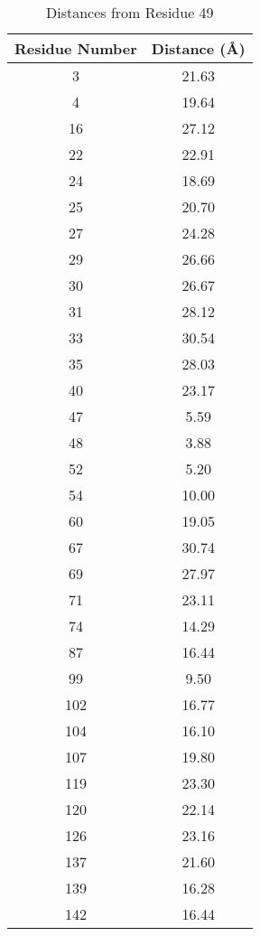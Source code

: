 \documentclass{article}
\begin{document}
\begin{table}[h]
    \centering
    \caption{Distances from Residue 49}
    \begin{tabular}{@{}cc@{}}
        \toprule
        \textbf{Residue Number} & \textbf{Distance (Å)} \\ \midrule
        3   & 21.63 \\ \hline
        4   & 19.64 \\ \hline
        16  & 27.12 \\ \hline
        22  & 22.91 \\ \hline
        24  & 18.69 \\ \hline
        25  & 20.70 \\ \hline
        27  & 24.28 \\ \hline
        29  & 26.66 \\ \hline
        30  & 26.67 \\ \hline
        31  & 28.12 \\ \hline
        33  & 30.54 \\ \hline
        35  & 28.03 \\ \hline
        40  & 23.17 \\ \hline
        47  & 5.59  \\ \hline
        48  & 3.88  \\ \hline
        52  & 5.20  \\ \hline
        54  & 10.00 \\ \hline
        60  & 19.05 \\ \hline
        67  & 30.74 \\ \hline
        69  & 27.97 \\ \hline
        71  & 23.11 \\ \hline
        74  & 14.29 \\ \hline
        87  & 16.44 \\ \hline
        99  & 9.50  \\ \hline
        102 & 16.77 \\ \hline
        104 & 16.10 \\ \hline
        107 & 19.80 \\ \hline
        119 & 23.30 \\ \hline
        120 & 22.14 \\ \hline
        126 & 23.16 \\ \hline
        137 & 21.60 \\ \hline
        139 & 16.28 \\ \hline
        142 & 16.44 \\ \hline

\end{tabular}
\end{table}
\end{document}
